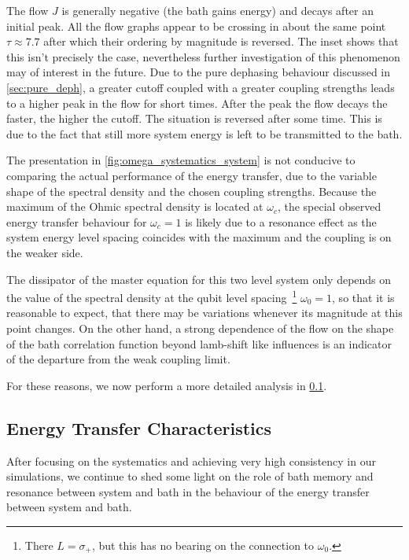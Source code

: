 The flow \(J\) is generally negative (the bath gains energy) and
decays after an initial peak. All the flow graphs appear to be
crossing in about the same point \(τ\approx 7.7\) after which their
ordering by magnitude is reversed.  The inset shows that this isn't
precisely the case, nevertheless further investigation of this
phenomenon may of interest in the future.  Due to the pure dephasing
behaviour discussed in \cref{sec:pure_deph}, a greater cutoff coupled
with a greater coupling strengths leads to a higher peak in the flow
for short times. After the peak the flow decays the faster, the higher
the cutoff. The situation is reversed after some time.  This is due to
the fact that still more system energy is left to be transmitted to
the bath.

The presentation in \cref{fig:omega_systematics_system} is not
conducive to comparing the actual performance of the energy transfer,
due to the variable shape of the spectral density and the chosen
coupling strengths. Because the maximum of the Ohmic spectral density
is located at \(ω_c\), the special observed energy transfer behaviour
for \(ω_c=1\) is likely due to a resonance effect as the system energy
level spacing coincides with the maximum and the coupling is on the
weaker side.

The dissipator of the master equation for this two level system only
depends on the value of the spectral density at the qubit level
spacing~\cite[p. 66]{Rivas2012}\footnote{There \(L=σ_{+}\), but this
  has no bearing on the connection to \(ω_{0}\).}  \(ω_{0}=1\), so
that it is reasonable to expect, that there may be variations whenever
its magnitude at this point changes.  On the other hand, a strong
dependence of the flow on the shape of the bath correlation function
beyond lamb-shift like influences is an indicator of the departure
from the weak coupling limit.  

For these reasons, we now perform a more detailed analysis in
\cref{sec:energy-transf-char}.

\subsection{Energy Transfer Characteristics}
\label{sec:energy-transf-char}
After focusing on the systematics and achieving very high consistency
in our simulations, we continue to shed some light on the role of bath
memory and resonance between system and bath in the behaviour of the
energy transfer between system and bath.


